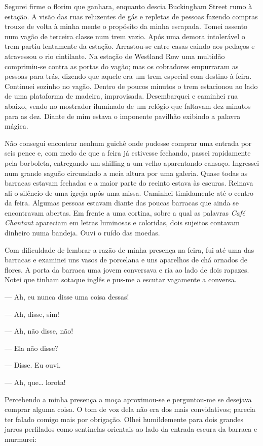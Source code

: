 Segurei firme o florim que ganhara, enquanto descia Buckingham
Street rumo à estação. A visão das ruas reluzentes de gás e repletas
de pessoas fazendo compras trouxe de volta à minha mente o propósito
da minha escapada. Tomei assento num vagão de terceira classe num trem
vazio. Após uma demora intolerável o trem partiu lentamente da
estação. Arrastou-se entre casas caindo aos pedaços e atravessou o rio
cintilante. Na estação de Westland Row uma multidão comprimiu-se
contra as portas do vagão; mas os cobradores empurraram as pessoas
para trás, dizendo que aquele era um trem especial com destino à
feira. Continuei sozinho no vagão. Dentro de poucos minutos o trem
estacionou ao lado de uma plataforma de madeira, improvisada.
Desembarquei e caminhei rua abaixo, vendo no mostrador iluminado de
um relógio que faltavam dez minutos para as dez. Diante de mim estava
o imponente pavilhão exibindo a palavra mágica.

Não consegui encontrar nenhum guichê onde pudesse comprar uma
entrada por seis pence e, com medo de que a feira já estivesse
fechando, passei rapidamente pela borboleta, entregando um shilling
a um velho aparentando cansaço. Ingressei num grande saguão circundado
a meia altura por uma galeria. Quase todas as barracas estavam
fechadas e a maior parte do recinto estava às escuras. Reinava ali o
silêncio de uma igreja após uma missa. Caminhei timidamente até o
centro da feira. Algumas pessoas estavam diante das poucas barracas
que ainda se encontravam abertas. Em frente a uma cortina, sobre a
qual as palavras \textit{Café Chantant} apareciam em letras luminosas e
coloridas, dois sujeitos contavam dinheiro numa bandeja. Ouvi o ruído
das moedas.

Com dificuldade de lembrar a razão de minha presença na feira, fui até
uma das barracas e examinei uns vasos de porcelana e uns aparelhos de
chá ornados de flores. A porta da barraca uma jovem conversava e ria
ao lado de dois rapazes. Notei que tinham sotaque inglês e pus-me a
escutar vagamente a conversa.

--- Ah, eu nunca disse uma coisa dessas!

--- Ah, disse, sim!

--- Ah, não disse, não!

--- Ela não disse?

--- Disse. Eu ouvi.

--- Ah, que\ldots{} lorota!

Percebendo a minha presença a moça aproximou-se e perguntou-me se
desejava comprar alguma coisa. O tom de voz dela não era dos mais
convidativos; parecia ter falado comigo mais por obrigação. Olhei
humildemente para dois grandes jarros perfilados como sentinelas
orientais ao lado da entrada escura da barraca e murmurei:

